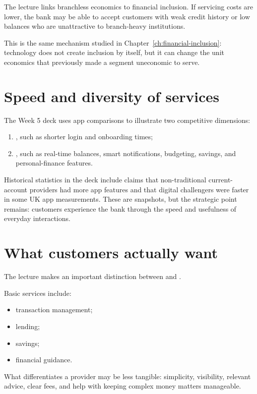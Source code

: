 The lecture links branchless economics to financial inclusion. If servicing costs are lower, the bank may be able to accept customers with weak credit history or low balances who are unattractive to branch-heavy institutions.

This is the same mechanism studied in Chapter~\ref{ch:financial-inclusion}: technology does not create inclusion by itself, but it can change the unit economics that previously made a segment uneconomic to serve.

\section{Speed and diversity of services}

The Week 5 deck uses app comparisons to illustrate two competitive dimensions:

\begin{enumerate}
  \item {}, such as shorter login and onboarding times;
  \item {}, such as real-time balances, smart notifications, budgeting, savings, and personal-finance features.
\end{enumerate}

Historical statistics in the deck include claims that non-traditional current-account providers had more app features and that digital challengers were faster in some UK app measurements. These are snapshots, but the strategic point remains: customers experience the bank through the speed and usefulness of everyday interactions.

\section{What customers actually want}

The lecture makes an important distinction between  and .

Basic services include:

\begin{itemize}
  \item transaction management;
  \item lending;
  \item savings;
  \item financial guidance.
\end{itemize}

What differentiates a provider may be less tangible: simplicity, visibility, relevant advice, clear fees, and help with keeping complex money matters manageable.

